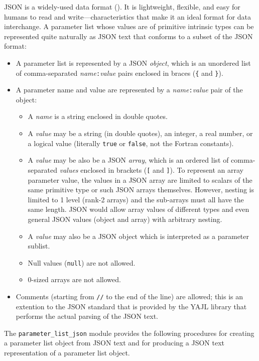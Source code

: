 \documentclass[11pt]{article}
\begin{document}
JSON is a widely-used data format ().  It is
lightweight, flexible, and easy for humans to read and write---characteristics
that make it an ideal format for data interchange.  A parameter list whose
values are of primitive intrinsic types can be represented quite naturally
as JSON text that conforms to a subset of the JSON format:
\begin{itemize}\setlength{\itemsep}{0pt}
\item
  A parameter list is represented by a JSON \emph{object}, which is an
  unordered list of comma-separated \emph{name}\texttt{:}\emph{value}
  pairs enclosed in braces (\texttt{\{} and \texttt{\}}).
\item
  A parameter name and value are represented by a
  \emph{name}\texttt{:}\emph{value} pair of the object:
  \begin{itemize}\setlength{\itemsep}{0pt}
  \item
    A \emph{name} is a string enclosed in double quotes.
  \item
    A \emph{value} may be a string (in double quotes), an integer, a real
    number, or a logical value (literally \texttt{true} or \texttt{false},
    not the Fortran constants).
  \item
    A \emph{value} may be also be a JSON \emph{array}, which is an ordered
    list of comma-separated \emph{values} enclosed in brackets (\texttt{[}
    and \texttt{]}).  To represent an array parameter value, the values in
    a JSON array are limited to scalars of the same primitive type or
    such JSON arrays themselves.  However, nesting is limited to 1 level
    (rank-2 arrays) and the sub-arrays must all have the same length.
    JSON would allow array values of different types and even general JSON
    values (object and array) with arbitrary nesting.
  \item
    A \emph{value} may also be a JSON object which is interpreted as a
    parameter sublist.
  \item
    Null values (\texttt{null}) are not allowed.
  \item
    0-sized arrays are not allowed.
  \end{itemize}
\item
  Comments (starting from \texttt{//} to the end of the line) are allowed;
  this is an extention to the JSON standard that is provided by the YAJL
  library that performs the actual parsing of the JSON text.
\end{itemize}

The \texttt{parameter_list_json} module provides the following procedures
for creating a parameter list object from JSON text and for producing a JSON
text representation of a parameter list object.
\end{document}

